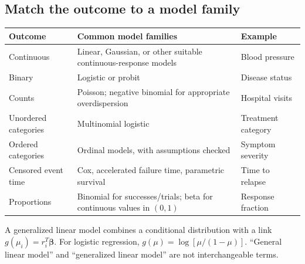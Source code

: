 \documentclass[11pt]{article}
\newcommand{\be}{\boldsymbol\beta}\newcommand{\eps}{\boldsymbol\varepsilon}\newcommand{\one}{\mathbf1}\newcommand{\R}{\mathbb R}
\begin{document}
\subsection{Match the outcome to a model family}
\par\smallskip
\begin{tabularx}{\linewidth}{p{.24\linewidth}LL}\toprule
Outcome&Common model families&Example\\\midrule
Continuous&Linear, Gaussian, or other suitable continuous-response models&Blood pressure\\
Binary&Logistic or probit&Disease status\\
Counts&Poisson; negative binomial for appropriate overdispersion&Hospital visits\\
Unordered categories&Multinomial logistic&Treatment category\\
Ordered categories&Ordinal models, with assumptions checked&Symptom severity\\
Censored event time&Cox, accelerated failure time, parametric survival&Time to relapse\\
Proportions&Binomial for successes/trials; beta for continuous values in $(0,1)$&Response fraction\\\bottomrule
\end{tabularx}
\par\smallskip
A generalized linear model combines a conditional distribution with a link $g(\mu_i)=r_i^T\be$. For logistic regression, $g(\mu)=\log[\mu/(1-\mu)]$. ``General linear model'' and ``generalized linear model'' are not interchangeable terms.

\end{document}
